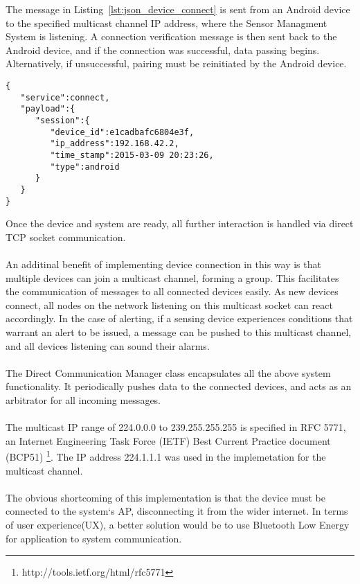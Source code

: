 \documentclass{article}
\begin{document}
The message in Listing~\ref{lst:json_device_connect} is sent from an Android device to the specified multicast channel IP address, where the Sensor Managment System is listening. A connection verification message is then sent back to the Android device, and if the connection was successful, data passing begins. Alternatively, if unsuccessful, pairing must be reinitiated by the Android device.
\begin{lstlisting}[caption={JSON Connection Message Object},label={lst:json_device_connect}]
{  
   "service":connect,
   "payload":{  
      "session":{  
         "device_id":e1cadbafc6804e3f,
         "ip_address":192.168.42.2,
         "time_stamp":2015-03-09 20:23:26,
         "type":android
      }
   }
}
\end{lstlisting}
Once the device and system are ready, all further interaction is handled via direct TCP socket communication.\\\\
An additinal benefit of implementing device connection in this way is that multiple devices can join a multicast channel, forming a group. This facilitates the communication of messages to all connected devices easily. As new devices connect, all nodes on the network listening on this multicast socket can react accordingly. In the case of alerting, if a sensing device experiences conditions that warrant an alert to be issued, a message can be pushed to this multicast channel, and all devices listening can sound their alarms. \\\\
The Direct Communication Manager class encapsulates all the above system functionality. It periodically pushes data to the connected devices, and acts as an arbitrator for all incoming messages.\\\\
The multicast IP range of 224.0.0.0 to 239.255.255.255 is specified in RFC 5771, an Internet Engineering Task Force (IETF) Best Current Practice document (BCP51)
\footnote{http://tools.ietf.org/html/rfc5771}. The IP address 224.1.1.1 was used in the implemetation for the multicast channel. \\\\
The obvious shortcoming of this implementation is that the device must be connected to the system\lq s AP, disconnecting it from the wider internet. In terms of user experience(UX), a better solution would be to use Bluetooth Low Energy for application to system communication. 

\newpage
\end{document}
